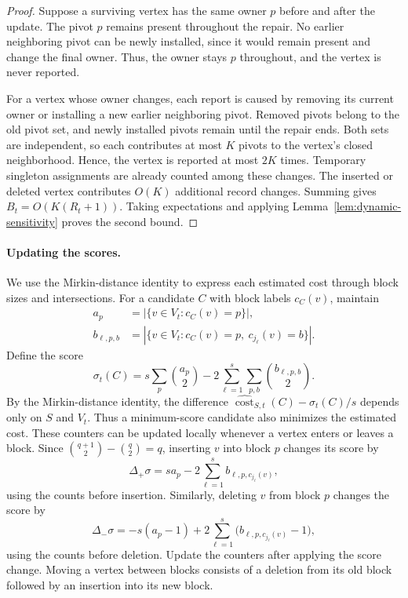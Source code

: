 \documentclass[11pt]{article}
\theoremstyle{definition}
\theoremstyle{remark}
\newcommand{\1}{\mathbf{1}}
\begin{document}
\begin{proof}
Suppose a surviving vertex has the same owner $p$ before and after the update. The pivot $p$ remains present throughout the repair. No earlier neighboring pivot can be newly installed, since it would remain present and change the final owner. Thus, the owner stays $p$ throughout, and the vertex is never reported.

For a vertex whose owner changes, each report is caused by removing its current owner or installing a new earlier neighboring pivot. Removed pivots belong to the old pivot set, and newly installed pivots remain until the repair ends. Both sets are independent, so each contributes at most $K$ pivots to the vertex's closed neighborhood. Hence, the vertex is reported at most $2K$ times. Temporary singleton assignments are already counted among these changes.
The inserted or deleted vertex contributes $O(K)$ additional record changes. Summing gives $B_t=O(K(R_t+1))$. Taking expectations and applying Lemma~\ref{lem:dynamic-sensitivity} proves the second bound.
\end{proof}

\paragraph{Updating the scores.}
We use the Mirkin-distance identity to express each estimated cost through block sizes and intersections. For a candidate $C$ with block labels $c_C(v)$, maintain
\[
\begin{aligned}
    a_p&=|\{v\in V_t:c_C(v)=p\}|,\\
    b_{\ell,p,b}
    &=|\{v\in V_t:c_C(v)=p,\ c_{j_\ell}(v)=b\}|.
\end{aligned}
\]
Define the score
\begin{equation}
    \sigma_t(C)
    =s\sum_p\binom{a_p}{2}
     -2\sum_{\ell=1}^{s}\sum_{p,b}\binom{b_{\ell,p,b}}{2}.
    \label{eq:dynamic-score}
\end{equation}
By the Mirkin-distance identity, the difference
$\widehat{\operatorname{cost}}_{S,t}(C)-\sigma_t(C)/s$ depends only on
$S$ and $V_t$. Thus a minimum-score candidate also minimizes the
estimated cost.
These counters can be updated locally whenever a vertex enters or leaves a block. Since $\binom{q+1}{2}-\binom q2=q$, inserting $v$ into block $p$ changes its score by
\[
    \Delta_+\sigma
    =sa_p-2\sum_{\ell=1}^{s}b_{\ell,p,c_{j_\ell}(v)},
\]
using the counts before insertion. Similarly, deleting $v$ from block $p$ changes the score by
\[
    \Delta_-\sigma
    =-s(a_p-1)
     +2\sum_{\ell=1}^{s}\bigl(b_{\ell,p,c_{j_\ell}(v)}-1\bigr),
\]
using the counts before deletion. Update the counters after applying the score change. Moving a vertex between blocks consists of a deletion from its old block followed by an insertion into its new block.
\end{document}
